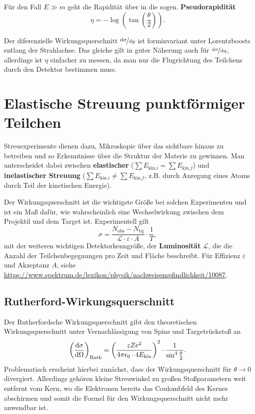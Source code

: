 Für den Fall $E\gg m$ geht die Rapidität über in die sogen. \textbf{Pseudorapidität}
\begin{equation*}
	\eta = -\log\left(\tan\left(\frac{\theta}{2}\right)\right).
\end{equation*}

Der diferenzielle Wirkungsquerschnitt $\nicefrac{\text{d}\sigma}{\text{d}y}$ ist forminvariant unter Lorentzboosts entlang der Strahlachse.
Das gleiche gilt in guter Näherung auch für $\nicefrac{\text{d}\sigma}{\text{d}\eta}$, allerdings ist $\eta$ einfacher zu messen, da man nur die Flugrichtung des Teilchens durch den Detektor bestimmen muss.

\section{Elastische Streuung punktförmiger Teilchen}
Streuexperimente dienen dazu, Mikroskopie über das sichtbare hinaus zu betreiben und so Erkenntnisse über die Struktur der Materie zu gewinnen.
Man unterscheidet dabei zwischen \textbf{elastischer} ($\sum E_{\text{kin,}i} = \sum E_{\text{kin,}f}$) und \textbf{inelastischer Streuung} ($\sum E_{\text{kin,}i} \neq \sum E_{\text{kin,}f}$, z.B. durch Anregung eines Atoms durch Teil der kinetischen Energie).

Der Wirkungsquerschnitt ist die wichtigste Größe bei solchen Experimenten und ist ein Maß dafür, wie wahrscheinlich eine Wechselwirkung zwischen dem Projektil und dem Target ist.
Experimentell gilt
\begin{equation*}
	\sigma = \frac{N_\text{obs}-N_\text{bg}}{\mathcal{L}\cdot\varepsilon\cdot A}\cdot\frac{1}{T},
\end{equation*}
mit der weiteren wichtigen Detektorkenngröße, der \textbf{Luminosität} $\mathcal{L}$, die die Anzahl der Teilchenbegegnungen pro Zeit und Fläche beschreibt.
Für Effizienz $\varepsilon$ und Akzeptanz $A$, siehe \url{https://www.spektrum.de/lexikon/physik/nachweisempfindlichkeit/10087}.

\subsection{Rutherford-Wirkungsquerschnitt}
Der Rutherfordsche Wirkungsquerschnitt gibt den theoretischen Wirkungsquerschnitt unter Vernachlässigung von Spins und Targetrückstoß an
\begin{equation}\label{eq:ruth_sigma}
	\left(\diff[\sigma]{\Omega}\right)_\text{Ruth} = \left(\frac{zZe^2}{4\pi\epsilon_0\cdot 4E_\text{kin}}\right)^2\cdot\frac{1}{\sin^4\frac{\theta}{2}}.
\end{equation}
Problematisch erscheint hierbei zunächst, dass der Wirkungsquerschnitt für $\theta\rightarrow 0$ divergiert.
Allerdings gehören kleine Streuwinkel zu großen Stoßparametern weit entfernt vom Kern, wo die Elektronen bereits das Coulombfeld des Kernes abschirmen und somit die Formel für den Wirkungsquerschnitt nicht mehr anwendbar ist.

